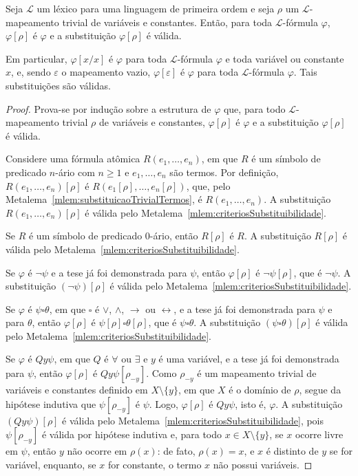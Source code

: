 \begin{metalemma}\label{mlem:substituicaoTrivial}
    Seja $\mathcal L$ um léxico para uma linguagem de primeira ordem e seja $\rho$ um $\mathcal L$-mapeamento trivial de variáveis e constantes.
    Então, para toda $\mathcal L$-fórmula $\varphi$, $\varphi[\rho]$ é $\varphi$ e a substituição $\varphi[\rho]$ é válida.

    Em particular, $\varphi[x/x]$ é $\varphi$ para toda $\mathcal L$-fórmula $\varphi$ e toda variável ou constante $x$, e, sendo $\varepsilon$ o mapeamento vazio, $\varphi[\varepsilon]$ é $\varphi$ para toda $\mathcal L$-fórmula $\varphi$.
    Tais substituições são válidas.
\end{metalemma}

\begin{proof}
    Prova-se por indução sobre a estrutura de $\varphi$ que, para todo $\mathcal L$-mapeamento trivial $\rho$ de variáveis e constantes, $\varphi[\rho]$ é $\varphi$ e a substituição $\varphi[\rho]$ é válida.

    Considere uma fórmula atômica $R(e_1, \dots, e_n)$, em que $R$ é um símbolo de predicado $n$-ário com $n\geq 1$ e $e_1, \dots, e_n$ são termos.
    Por definição, $R(e_1, \dots, e_n)[\rho]$ é $R(e_1[\rho], \dots, e_n[\rho])$, que, pelo Metalema~\ref{mlem:substituicaoTrivialTermos}, é $R(e_1, \dots, e_n)$.
    A substituição $R(e_1, \dots, e_n)[\rho]$ é válida pelo Metalema~\ref{mlem:criteriosSubstituibilidade}.

    Se $R$ é um símbolo de predicado 0-ário, então $R[\rho]$ é $R$.
    A substituição $R[\rho]$ é válida pelo Metalema~\ref{mlem:criteriosSubstituibilidade}.

    Se $\varphi$ é $\neg \psi$ e a tese já foi demonstrada para $\psi$, então $\varphi[\rho]$ é $\neg \psi[\rho]$, que é $\neg \psi$.
    A substituição $(\neg \psi)[\rho]$ é válida pelo Metalema~\ref{mlem:criteriosSubstituibilidade}.

    Se $\varphi$ é $\psi \square \theta$, em que $\square$ é $\vee$, $\wedge$, $\rightarrow$ ou $\leftrightarrow$, e a tese já foi demonstrada para $\psi$ e para $\theta$, então $\varphi[\rho]$ é $\psi[\rho] \square \theta[\rho]$, que é $\psi \square \theta$.
    A substituição $(\psi\square\theta)[\rho]$ é válida pelo Metalema~\ref{mlem:criteriosSubstituibilidade}.
    
    Se $\varphi$ é $Q y \psi$, em que $Q$ é $\forall$ ou $\exists$ e $y$ é uma variável, e a tese já foi demonstrada para $\psi$, então $\varphi[\rho]$ é $Q y \psi[\rho_{-y}]$.
    Como $\rho_{-y}$ é um mapeamento trivial de variáveis e constantes definido em $X\setminus\{y\}$, em que $X$ é o domínio de $\rho$, segue da hipótese indutiva que $\psi[\rho_{-y}]$ é $\psi$.
    Logo, $\varphi[\rho]$ é $Q y \psi$, isto é, $\varphi$.
    A substituição $(Q y \psi)[\rho]$ é válida pelo Metalema~\ref{mlem:criteriosSubstituibilidade}, pois $\psi[\rho_{-y}]$ é válida por hipótese indutiva e, para todo $x\in X\setminus\{y\}$, se $x$ ocorre livre em $\psi$, então $y$ não ocorre em $\rho(x)$: de fato, $\rho(x)=x$, e $x$ é distinto de $y$ se for variável, enquanto, se $x$ for constante, o termo $x$ não possui variáveis.
\end{proof}

